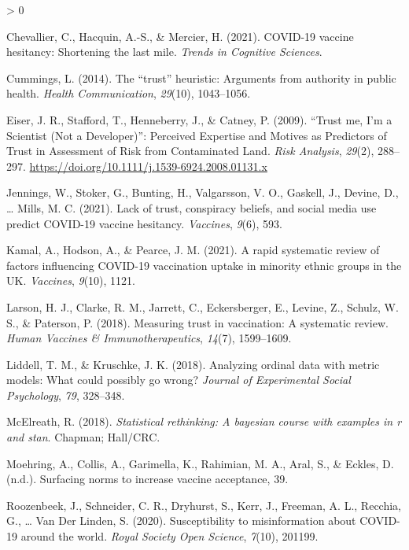 \documentclass[
  english,
  ,jou,floatsintext]{apa6}
\newlength{\cslhangindent}
\newenvironment{CSLReferences}[2] %
 {%
  \setlength{\parindent}{0pt}
  \ifodd #1 \everypar{\setlength{\hangindent}{\cslhangindent}}\ignorespaces\fi
  \ifnum #2 > 0
  \setlength{\parskip}{#2\baselineskip}
  \fi
 }%
 {}
\begin{document}
\begin{CSLReferences}{1}{0}
\leavevmode\hypertarget{ref-chevallier2021covid}{}%
Chevallier, C., Hacquin, A.-S., \& Mercier, H. (2021). COVID-19 vaccine hesitancy: Shortening the last mile. \emph{Trends in Cognitive Sciences}.

\leavevmode\hypertarget{ref-cummings2014trust}{}%
Cummings, L. (2014). The {``trust''} heuristic: Arguments from authority in public health. \emph{Health Communication}, \emph{29}(10), 1043--1056.

\leavevmode\hypertarget{ref-eiser_trust_2009}{}%
Eiser, J. R., Stafford, T., Henneberry, J., \& Catney, P. (2009). {``{Trust} me, {I}'m a {Scientist} ({Not} a {Developer})''}: {Perceived} {Expertise} and {Motives} as {Predictors} of {Trust} in {Assessment} of {Risk} from {Contaminated} {Land}. \emph{Risk Analysis}, \emph{29}(2), 288--297. \url{https://doi.org/10.1111/j.1539-6924.2008.01131.x}

\leavevmode\hypertarget{ref-jennings2021lack}{}%
Jennings, W., Stoker, G., Bunting, H., Valgarsson, V. O., Gaskell, J., Devine, D., \ldots{} Mills, M. C. (2021). Lack of trust, conspiracy beliefs, and social media use predict COVID-19 vaccine hesitancy. \emph{Vaccines}, \emph{9}(6), 593.

\leavevmode\hypertarget{ref-kamal2021rapid}{}%
Kamal, A., Hodson, A., \& Pearce, J. M. (2021). A rapid systematic review of factors influencing COVID-19 vaccination uptake in minority ethnic groups in the UK. \emph{Vaccines}, \emph{9}(10), 1121.

\leavevmode\hypertarget{ref-larson2018measuring}{}%
Larson, H. J., Clarke, R. M., Jarrett, C., Eckersberger, E., Levine, Z., Schulz, W. S., \& Paterson, P. (2018). Measuring trust in vaccination: A systematic review. \emph{Human Vaccines \& Immunotherapeutics}, \emph{14}(7), 1599--1609.

\leavevmode\hypertarget{ref-liddell2018analyzing}{}%
Liddell, T. M., \& Kruschke, J. K. (2018). Analyzing ordinal data with metric models: What could possibly go wrong? \emph{Journal of Experimental Social Psychology}, \emph{79}, 328--348.

\leavevmode\hypertarget{ref-mcelreath2018statistical}{}%
McElreath, R. (2018). \emph{Statistical rethinking: A bayesian course with examples in r and stan}. Chapman; Hall/CRC.

\leavevmode\hypertarget{ref-moehring_surfacing_2021}{}%
Moehring, A., Collis, A., Garimella, K., Rahimian, M. A., Aral, S., \& Eckles, D. (n.d.). Surfacing norms to increase vaccine acceptance, 39.

\leavevmode\hypertarget{ref-roozenbeek2020susceptibility}{}%
Roozenbeek, J., Schneider, C. R., Dryhurst, S., Kerr, J., Freeman, A. L., Recchia, G., \ldots{} Van Der Linden, S. (2020). Susceptibility to misinformation about COVID-19 around the world. \emph{Royal Society Open Science}, \emph{7}(10), 201199.


\end{CSLReferences}
\end{document}
